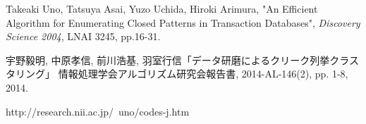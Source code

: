 
\begin{thebibliography}{9}
Takeaki Uno, Tatsuya Asai, Yuzo Uchida, Hiroki Arimura, "An Efficient Algorithm for Enumerating Closed Patterns in Transaction Databases", {\it Discovery Science 2004}, LNAI 3245, pp.16-31.

宇野毅明, 中原孝信, 前川浩基, 羽室行信「データ研磨によるクリーク列挙クラスタリング」
情報処理学会アルゴリズム研究会報告書, 2014-AL-146(2), pp. 1-8, 2014.

http://research.nii.ac.jp/~uno/codes-j.htm

\end{thebibliography}

